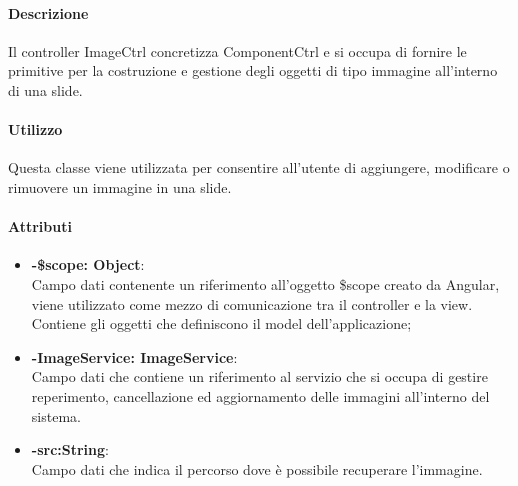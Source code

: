    \paragraph{Descrizione}
	Il controller ImageCtrl concretizza ComponentCtrl e si occupa di fornire le primitive per la costruzione e gestione degli oggetti di tipo immagine all'interno di una slide.

	\paragraph{Utilizzo}
	Questa classe viene utilizzata per consentire all'utente di aggiungere, modificare o rimuovere un immagine in una slide.

	\paragraph{Attributi}
	\begin{itemize}
		\item \textbf{-\$scope: Object}:\\
			Campo dati contenente un riferimento all'oggetto \$scope creato da Angular, viene utilizzato come mezzo di comunicazione tra il controller e la view. Contiene gli oggetti che definiscono il model dell'applicazione;
		\item \textbf{-ImageService: ImageService}:\\
			Campo dati che contiene un riferimento al servizio che si occupa di gestire reperimento, cancellazione ed aggiornamento delle immagini all'interno del sistema.
		\item\textbf{-src:String}:\\
			Campo dati che indica il percorso dove è possibile recuperare l'immagine.
	\end{itemize}


